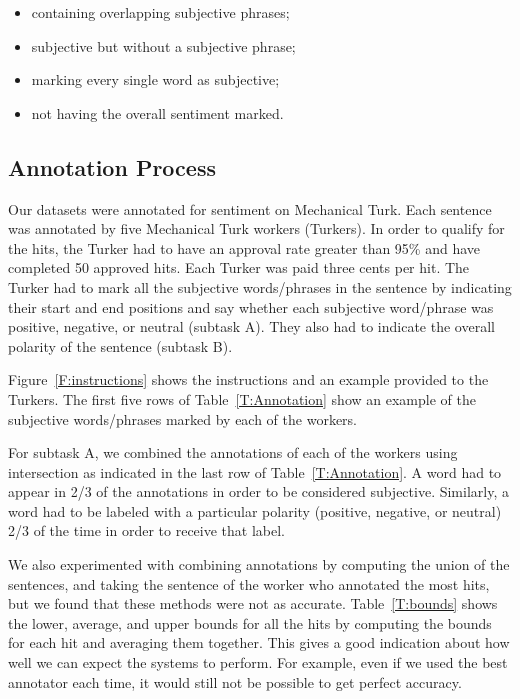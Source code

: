 \begin{itemize}[noitemsep]
\item containing overlapping subjective phrases;
\item subjective but without a subjective phrase;
\item marking every single word as subjective;
\item not having the overall sentiment marked.
\end{itemize}

\subsection{Annotation Process}

Our datasets were annotated for sentiment on Mechanical Turk. Each sentence was annotated by five Mechanical Turk workers (Turkers). In order to qualify for the hits, the Turker had to have an approval rate greater than 95\% and have completed 50 approved hits. Each Turker was paid three cents per hit. The Turker had to mark all the subjective words/phrases in the sentence by indicating their start and end positions and say whether each subjective word/phrase was positive, negative, or neutral (subtask A). They also had to indicate the overall polarity of the sentence (subtask B).


Figure~\ref{F:instructions} shows the instructions and an example provided to the Turkers.
The first five rows of Table~\ref{T:Annotation} show an example of the subjective words/phrases
marked by each of the workers.

For subtask A, we combined the annotations of each of the workers using intersection as indicated in the last row of Table~\ref{T:Annotation}. A word had to appear in 2/3 of the annotations in order to be considered subjective.  Similarly, a word had to be labeled with a particular polarity (positive, negative, or neutral) 2/3 of the time in order to receive that label.

We also experimented with combining annotations by computing the union of the sentences, and taking the sentence of the worker who annotated the most hits, but we found that these methods were not as accurate. Table~\ref{T:bounds} shows the lower, average, and upper bounds for all the hits by computing the bounds for each hit and averaging them together. This gives a good indication about how well we can expect the systems to perform. For example, even if we used the best annotator each time, it would still not be possible to get perfect accuracy.

